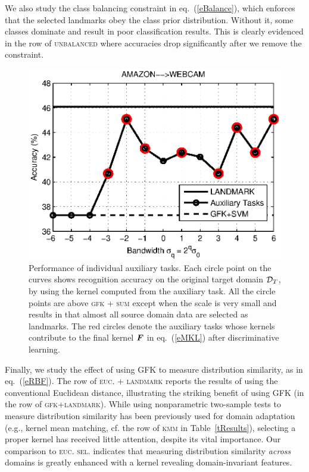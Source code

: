 We also study the class balancing constraint in eq.~(\ref{eBalance}), which enforces that the selected landmarks obey the class prior distribution. Without it, some classes dominate and  result in poor classification results. This is clearly evidenced in the row of  \textsc{unbalanced} where accuracies drop significantly after we remove the constraint.


\begin{figure}
  \centering
    \includegraphics[width=0.5\columnwidth]{fig/AtoW_diff_sigma.eps}
  \caption{Performance of individual auxiliary tasks. Each circle point on the curves shows recognition accuracy on the original target domain $\mathcal{D}_{T}$, by using the kernel computed from the auxiliary task. All the circle points are above \textsc{gfk + sum} except when the scale is very small and results in that almost all source domain data are selected as landmarks. The red circles denote the auxiliary tasks whose kernels contribute to the final kernel $\boldsymbol{F}$ in eq.~(\ref{eMKL}) after  discriminative learning. }\label{fAuxiliary}
\end{figure}



Finally, we study the effect of using GFK  to measure distribution similarity, as in eq.~(\ref{eRBF}). The row of \textsc{euc. + landmark} reports the results of using the conventional Euclidean distance, illustrating the striking  benefit of using GFK (in the row of \textsc{gfk+landmark}).
While using nonparametric two-sample tests to measure distribution similarity has been previously used for domain adaptation (e.g., kernel mean matching, cf. the row of \textsc{kmm} in Table~\ref{tResults}), selecting a proper kernel has received little attention, despite its vital importance. Our comparison to \textsc{euc. sel.} indicates that
measuring distribution similarity \emph{across} domains is greatly enhanced with a kernel revealing domain-invariant features.

